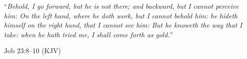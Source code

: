 \documentclass[
11pt,
oneside, %
ukrainian,
english, %
singlespacing, %
headsepline, %
]{BachelorMasterThesis}
\begin{document}





\vspace*{0.2\textheight}

\noindent\enquote{\itshape Behold, I go forward, but he is not there; and backward, but I cannot perceive him: On the left hand, where he doth work, but I cannot behold him: he hideth himself on the right hand, that I cannot see him: But he knoweth the way that I take: when he hath tried me, I shall come forth as gold.}\bigbreak

\hfill Job 23:8--10 (KJV)
\end{document}

